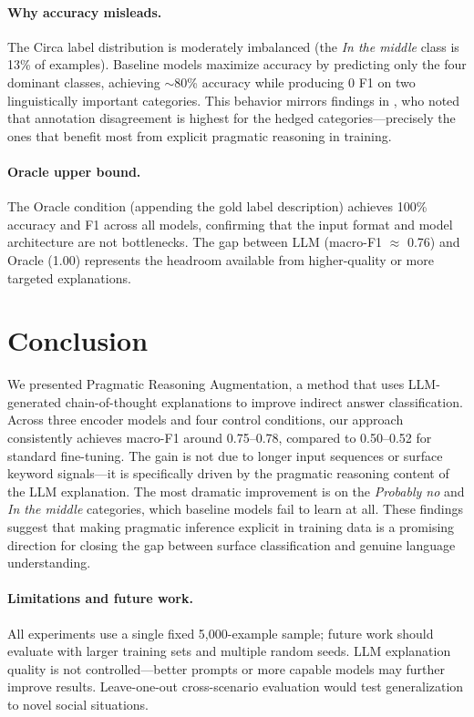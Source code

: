 \documentclass[11pt,a4paper]{article}
\begin{document}
\paragraph{Why accuracy misleads.}
The Circa label distribution is moderately imbalanced (the \textit{In the middle} class is 13\% of examples). Baseline models maximize accuracy by predicting only the four dominant classes, achieving $\sim$80\% accuracy while producing 0 F1 on two linguistically important categories. This behavior mirrors findings in \citet{louis2020}, who noted that annotation disagreement is highest for the hedged categories---precisely the ones that benefit most from explicit pragmatic reasoning in training.

\paragraph{Oracle upper bound.}
The Oracle condition (appending the gold label description) achieves 100\% accuracy and F1 across all models, confirming that the input format and model architecture are not bottlenecks. The gap between LLM (macro-F1 $\approx$ 0.76) and Oracle (1.00) represents the headroom available from higher-quality or more targeted explanations.

\section{Conclusion}

We presented Pragmatic Reasoning Augmentation, a method that uses LLM-generated chain-of-thought explanations to improve indirect answer classification. Across three encoder models and four control conditions, our approach consistently achieves macro-F1 around 0.75--0.78, compared to 0.50--0.52 for standard fine-tuning. The gain is not due to longer input sequences or surface keyword signals---it is specifically driven by the pragmatic reasoning content of the LLM explanation. The most dramatic improvement is on the \textit{Probably no} and \textit{In the middle} categories, which baseline models fail to learn at all. These findings suggest that making pragmatic inference explicit in training data is a promising direction for closing the gap between surface classification and genuine language understanding.

\paragraph{Limitations and future work.}
All experiments use a single fixed 5,000-example sample; future work should evaluate with larger training sets and multiple random seeds. LLM explanation quality is not controlled---better prompts or more capable models may further improve results. Leave-one-out cross-scenario evaluation would test generalization to novel social situations.
\end{document}
